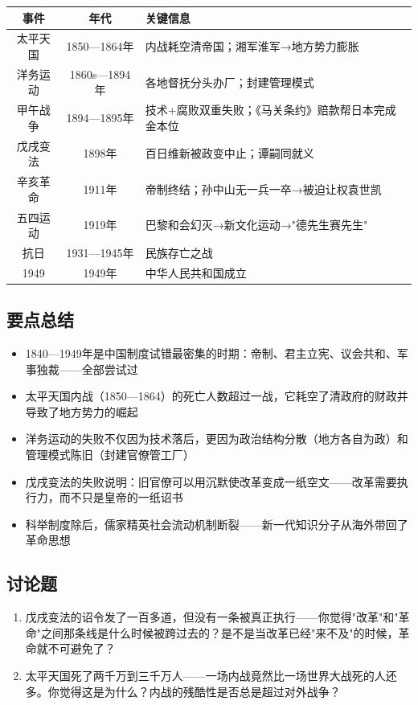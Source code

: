 \documentclass[a4paper,12pt]{ctexart}
\begin{document}
\begin{center}
\begin{tabular}{|c|c|p{7cm}|}
\hline
\textbf{事件} & \textbf{年代} & \textbf{关键信息} \\
\hline
太平天国 & 1850—1864年 & 内战耗空清帝国；湘军淮军→地方势力膨胀 \\
\hline
洋务运动 & 1860s—1894年 & 各地督抚分头办厂；封建管理模式 \\
\hline
甲午战争 & 1894—1895年 & 技术+腐败双重失败；《马关条约》赔款帮日本完成金本位 \\
\hline
戊戌变法 & 1898年 & 百日维新被政变中止；谭嗣同就义 \\
\hline
辛亥革命 & 1911年 & 帝制终结；孙中山无一兵一卒→被迫让权袁世凯 \\
\hline
五四运动 & 1919年 & 巴黎和会幻灭→新文化运动→"德先生赛先生" \\
\hline
抗日 & 1931—1945年 & 民族存亡之战 \\
\hline
1949 & 1949年 & 中华人民共和国成立 \\
\hline
\end{tabular}
\end{center}

\subsection*{要点总结}
\begin{itemize}
  \item 1840—1949年是中国制度试错最密集的时期：帝制、君主立宪、议会共和、军事独裁——全部尝试过
  \item 太平天国内战（1850—1864）的死亡人数超过一战，它耗空了清政府的财政并导致了地方势力的崛起
  \item 洋务运动的失败不仅因为技术落后，更因为政治结构分散（地方各自为政）和管理模式陈旧（封建官僚管工厂）
  \item 戊戌变法的失败说明：旧官僚可以用沉默使改革变成一纸空文——改革需要执行力，而不只是皇帝的一纸诏书
  \item 科举制度除后，儒家精英社会流动机制断裂——新一代知识分子从海外带回了革命思想
\end{itemize}

\subsection*{讨论题}
\begin{enumerate}
  \item 戊戌变法的诏令发了一百多道，但没有一条被真正执行——你觉得"改革"和"革命"之间那条线是什么时候被跨过去的？是不是当改革已经"来不及"的时候，革命就不可避免了？
  \item 太平天国死了两千万到三千万人——一场内战竟然比一场世界大战死的人还多。你觉得这是为什么？内战的残酷性是否总是超过对外战争？
\end{enumerate}
\end{document}
